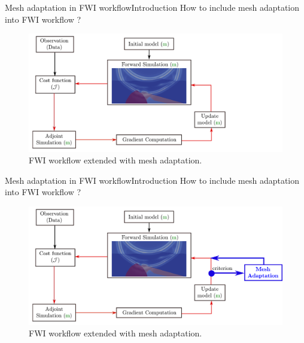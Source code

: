 
\begin{frame}{Mesh adaptation in FWI workflow}{Introduction}
  How to include mesh adaptation into FWI workflow ?
\begin{figure}[!htbp]
\centering
\includegraphics[scale=0.2]{image/fwi_workflow_mesh_adapt0.pdf}
\caption*{FWI workflow extended with mesh adaptation.}
\label{fwi_workflow_mesh_extended}
\end{figure}
\end{frame}


\begin{frame}[noframenumbering]{Mesh adaptation in FWI workflow}{Introduction}
  How to include mesh adaptation into FWI workflow ?
\begin{figure}[!htbp]
\centering
\includegraphics[scale=0.2]{image/fwi_workflow_mesh_adapt.pdf}
\caption*{FWI workflow extended with mesh adaptation.}
\label{fwi_workflow_mesh_extended}
\end{figure}
\end{frame}



